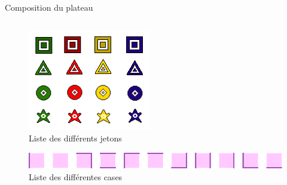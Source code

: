 \documentclass{beamer}
\begin{document}
\begin{frame}{Composition du plateau}
\begin{columns}
\begin{column}{6cm}
\begin{figure}
                        \centering
                        \includegraphics[scale=0.3]{images/listeJeton.png}
                        \caption{Liste des différents jetons}
                    \end{figure}
                    \begin{figure}
                        \centering
                        \includegraphics[scale=0.2]{images/liste_cases.png}
                        \caption{Liste des différentes cases}
                    \end{figure}
                \end{column}
            \end{columns}
        \end{frame}
\end{document}
